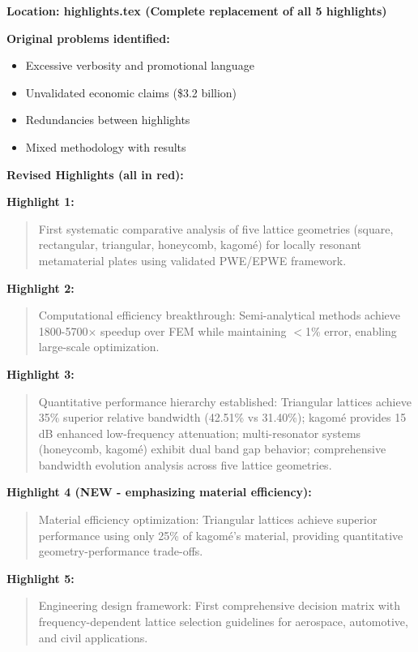 \documentclass[11pt,a4paper]{article}
\newenvironment{changesbox}{%
    \par\medskip\noindent{\color{changescolor}\rule{\linewidth}{2pt}}\par
    \noindent{\color{changescolor}\bfseries Manuscript Changes}\par\smallskip
}{%
    \par\noindent{\color{changescolor}\rule{\linewidth}{0.5pt}}\medskip
}
\begin{document}
\begin{changesbox}
\textbf{Location: highlights.tex (Complete replacement of all 5 highlights)}

\textbf{Original problems identified:}
\begin{itemize}
    \item Excessive verbosity and promotional language
    \item Unvalidated economic claims (\$3.2 billion)
    \item Redundancies between highlights
    \item Mixed methodology with results
\end{itemize}

\textbf{Revised Highlights (all in red):}

\textbf{Highlight 1:}
\begin{quote}
\textcolor{redtext}{First systematic comparative analysis of five lattice geometries (square, rectangular, triangular, honeycomb, kagomé) for locally resonant metamaterial plates using validated PWE/EPWE framework.}
\end{quote}

\textbf{Highlight 2:}
\begin{quote}
\textcolor{redtext}{Computational efficiency breakthrough: Semi-analytical methods achieve 1800-5700$\times$ speedup over FEM while maintaining $<$1\% error, enabling large-scale optimization.}
\end{quote}

\textbf{Highlight 3:}
\begin{quote}
\textcolor{redtext}{Quantitative performance hierarchy established: Triangular lattices achieve 35\% superior relative bandwidth (42.51\% vs 31.40\%); kagomé provides 15 dB enhanced low-frequency attenuation; multi-resonator systems (honeycomb, kagomé) exhibit dual band gap behavior; comprehensive bandwidth evolution analysis across five lattice geometries.}
\end{quote}

\textbf{Highlight 4 (NEW - emphasizing material efficiency):}
\begin{quote}
\textcolor{redtext}{Material efficiency optimization: Triangular lattices achieve superior performance using only 25\% of kagomé's material, providing quantitative geometry-performance trade-offs.}
\end{quote}

\textbf{Highlight 5:}
\begin{quote}
\textcolor{redtext}{Engineering design framework: First comprehensive decision matrix with frequency-dependent lattice selection guidelines for aerospace, automotive, and civil applications.}
\end{quote}


\end{changesbox}
\end{document}
